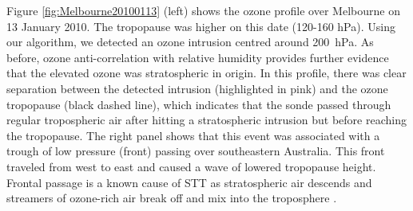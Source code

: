     \begin{figure*}[t]
      
      \caption{(Left) Vertical profile of ozone (black), relative humidity (blue), and temperature (red) measured by ozonesonde over Melbourne on 3 February 2005.
      The detected ozone STT event is highlighted in pink.
      Tropopause heights using both the ozone definition (black dashed line) and lapse rate definition (red dashed line) are also shown.
      (Right) Geopotential heights at 500 hPa from the ERA-Interim reanalysis, with wind vectors overplotted.
      Also shown are contours of potential vorticity units with 1 PVU in purple.}
      \label{fig:Melbourne20050203}
      
    \end{figure*}
    
    Figure \ref{fig:Melbourne20100113} (left) shows the ozone profile over Melbourne on 13 January 2010.
    The tropopause was higher on this date (120-160 hPa).
    Using our algorithm, we detected an ozone intrusion centred around 200~hPa.
    As before, ozone anti-correlation with relative humidity provides further evidence that the elevated ozone was stratospheric in origin.
    In this profile, there was clear separation between the detected intrusion (highlighted in pink) and the ozone tropopause (black dashed line), which indicates that the sonde passed through regular tropospheric air after hitting a stratospheric intrusion but before reaching the tropopause.
   The right panel shows that this event was associated with a trough of low pressure (front) passing over southeastern Australia.
    This front traveled from west to east and caused a wave of lowered tropopause height. 
    Frontal passage is a known cause of STT as stratospheric air descends and streamers of ozone-rich air break off and mix into the troposphere \citep{Sprenger2003}.
    
    \begin{figure*}[t]
      
      \caption{Same as Figure \ref{fig:Melbourne20050203} but for 13 January 2010.
	Also shown in this figure is the 2 PVU contour (white), often used to determine dynamical tropopause height.}
      \label{fig:Melbourne20100113}
      
    \end{figure*}

